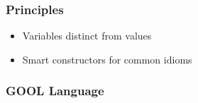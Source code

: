 \documentclass{beamer}
\begin{document}

\begin{frame}

\frametitle{Principles}

\begin{itemize}
  \item Variables distinct from values
  \item Smart constructors for common idioms
\end{itemize}

\end{frame}


\begin{frame}[fragile]

\frametitle{GOOL Language}


\end{frame}
\end{document}
